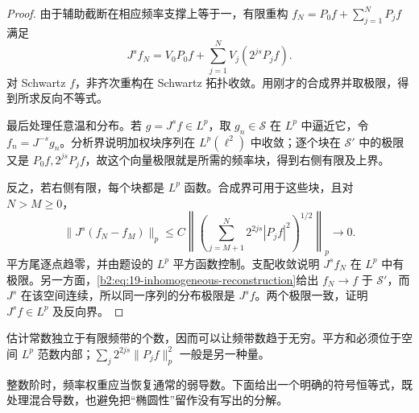 \begin{proof}
由于辅助截断在相应频率支撑上等于一，有限重构 \(f_N=P_0f+\sum_{j=1}^NP_jf\) 满足
\[
 J^sf_N=V_0P_0f+\sum_{j=1}^NV_j(2^{js}P_jf).
\]
对 Schwartz \(f\)，非齐次重构在 Schwartz 拓扑收敛。用刚才的合成界并取极限，得到所求反向不等式。

最后处理任意温和分布。若 \(g=J^sf\in L^p\)，取 \(g_n\in\mathcal S\) 在 \(L^p\) 中逼近它，令 \(f_n=J^{-s}g_n\)。分析界说明加权块序列在 \(L^p(\ell^2)\) 中收敛；逐个块在 \(\mathcal S'\) 中的极限又是 \(P_0f,2^{js}P_jf\)，故这个向量极限就是所需的频率块，得到右侧有限及上界。

反之，若右侧有限，每个块都是 \(L^p\) 函数。合成界可用于这些块，且对 \(N>M\geq0\)，
\[
 \|J^s(f_N-f_M)\|_p
 \leq C\left\|\left(
       \sum_{j=M+1}^N2^{2js}|P_jf|^2\right)^{1/2}\right\|_p
 \longrightarrow0.
\]
平方尾逐点趋零，并由题设的 \(L^p\) 平方函数控制。支配收敛说明 \(J^sf_N\) 在 \(L^p\) 中有极限。另一方面，\cref{b2:eq:19-inhomogeneous-reconstruction}给出 \(f_N\to f\) 于 \(\mathcal S'\)，而 \(J^s\) 在该空间连续，所以同一序列的分布极限是 \(J^sf\)。两个极限一致，证明 \(J^sf\in L^p\) 及反向界。
\end{proof}
估计常数独立于有限频带的个数，因而可以让频带数趋于无穷。平方和必须位于空间 \(L^p\) 范数内部；\(\sum_j2^{2js}\|P_jf\|_p^2\) 一般是另一种量。

\ProseParagraphBreak

整数阶时，频率权重应当恢复通常的弱导数。下面给出一个明确的符号恒等式，既处理混合导数，也避免把“椭圆性”留作没有写出的分解。

